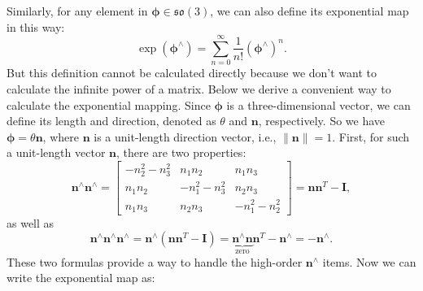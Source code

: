 Similarly, for any element in $\boldsymbol{\phi} \in \mathfrak{so}(3)$, we can also define its exponential map in this way:
\begin{equation}
\exp(\boldsymbol{\phi}^\wedge) = \sum\limits_{n = 0}^\infty {\frac{1}{{n!}}{ (\boldsymbol{\phi}^{\wedge })^n}}.
\end{equation}
But this definition cannot be calculated directly because we don't want to calculate the infinite power of a matrix. Below we derive a convenient way to calculate the exponential mapping. Since $\boldsymbol{\phi}$ is a three-dimensional vector, we can define its length and direction,  denoted as $\theta$ and $\mathbf{n}$, respectively. So we have $\boldsymbol{\phi} = \theta \mathbf{n}$, where $\mathbf{n}$ is a unit-length direction vector, i.e., $\| \mathbf{n} \| =1$. First, for such a unit-length vector $\mathbf{n}$, there are two properties:
\begin{equation}
 \mathbf{n}^{\wedge} \mathbf{n}^{\wedge} = \left[ {\begin{array}{*{20}{c}}
{ - n_2^2 - n_3^2}&{{n_1}{n_2}}&{{n_1}{n_3}}\\
{{n_1}{n_2}}&{ - n_1^2 - n_3^2}&{{n_2}{n_3}}\\
{{n_1}{n_3}}&{{n_2}{n_3}}&{ - n_1^2 - n_2^2}
\end{array}} \right] = \mathbf{n} \mathbf{n}^T - \mathbf{I},
\end{equation}
as well as
\begin{equation}
\mathbf{n}^{\wedge} \mathbf{n}^{\wedge} \mathbf{n}^{\wedge} = \mathbf{n}^\wedge (\mathbf{n}\mathbf{n} ^T-\mathbf{I}) = \underbrace{\mathbf{n}^\wedge \mathbf{n}}_{\text{zero}} \mathbf{n}^T - \mathbf{n}^{\wedge} = - \mathbf{n}^{\wedge}.
\end{equation}
These two formulas provide a way to handle the high-order $\mathbf{n}^\wedge$ items. Now we can write the exponential map as:
